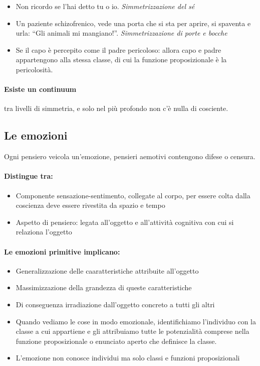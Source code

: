 \documentclass[12pt, a4paper]{article}
\begin{document}
\begin{itemize}
    \item Non ricordo se l'hai detto tu o io. \emph{Simmetrizzazione del sé}
    \item Un paziente schizofrenico, vede una porta che si sta per aprire, si spaventa e urla: ``Gli animali mi mangiano!''. \emph{Simmetrizzazione di porte e bocche}
    \item Se il capo è percepito come il padre pericoloso: allora capo e padre appartengono alla stessa classe, di cui la funzione proposizionale è la pericolosità.
\end{itemize}

\paragraph{Esiste un continuum} tra livelli di simmetria, e solo nel più profondo non c'è nulla di cosciente.

\subsection{Le emozioni}

Ogni pensiero veicola un'emozione, pensieri aemotivi contengono difese o censura.

\paragraph{Distingue tra:}  
\begin{itemize}
    \item Componente sensazione-sentimento, collegate al corpo, per essere colta dalla coscienza deve essere rivestita da spazio e tempo
    \item Aspetto di pensiero: legata all'oggetto e all'attività cognitiva con cui si relaziona l'oggetto
\end{itemize}

\paragraph{Le emozioni primitive implicano:}  
\begin{itemize}
    \item Generalizzazione delle caaratteristiche attribuite all'oggetto
    \item Massimizzazione della grandezza di queste caratteristiche 
    \item Di conseguenza irradiazione dall'oggetto concreto a tutti gli altri
    \item Quando vediamo le cose in modo emozionale, identifichiamo l'individuo con la classe a cui appartiene e gli attribuiamo tutte le potenzialità comprese nella funzione proposizionale o enunciato aperto che definisce la classe.
    \item L'emozione non conosce individui ma solo classi e funzioni proposizionali
\end{itemize}
\end{document}
